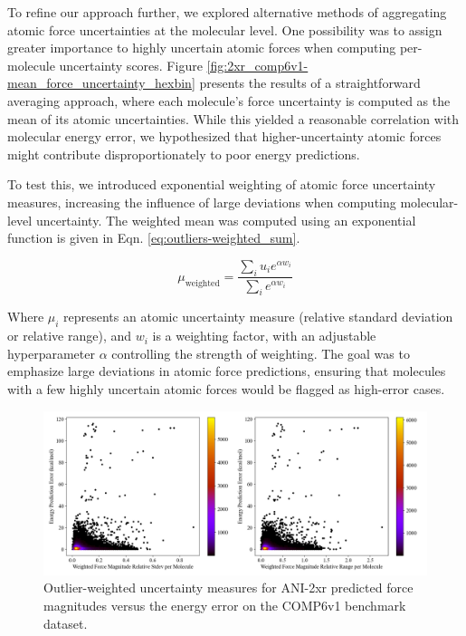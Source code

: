 To refine our approach further, we explored alternative methods of aggregating atomic force uncertainties at the molecular level. One possibility was to assign greater importance to highly uncertain atomic forces when computing per-molecule uncertainty scores. Figure \ref{fig:2xr_comp6v1-mean_force_uncertainty_hexbin} presents the results of a straightforward averaging approach, where each molecule's force uncertainty is computed as the mean of its atomic uncertainties. While this yielded a reasonable correlation with molecular energy error, we hypothesized that higher-uncertainty atomic forces might contribute disproportionately to poor energy predictions.

To test this, we introduced exponential weighting of atomic force uncertainty measures, increasing the influence of large deviations when computing molecular-level uncertainty. The weighted mean was computed using an exponential function is given in Eqn. \ref{eq:outliers-weighted_sum}.

\begin{equation} 
\mu_{\text{weighted}} = \frac{\sum_i u_i e^{\alpha w_i}}{\sum_i e^{\alpha w_i}} 
\label{eq:outliers-weighted_sum}
\end{equation}

Where $\mu_i$ represents an atomic uncertainty measure (relative standard deviation or relative range), and $w_i$ is a weighting factor, with an adjustable hyperparameter $\alpha$ controlling the strength of weighting. The goal was to emphasize large deviations in atomic force predictions, ensuring that molecules with a few highly uncertain atomic forces would be flagged as high-error cases.


\begin{figure}[!hp]
    \centering
    \includegraphics[width=1\linewidth]{Images/2xr_forces/2xr_comp6v1_force-weighted-uncertainty-vs-energy.png}
    \caption[Force uncertainty weighted by outliers versus energy error (COMP6v1)]{Outlier-weighted uncertainty measures for ANI-2xr predicted force magnitudes versus the energy error on the COMP6v1 benchmark dataset.}
    \label{fig:2xr_comp6v1-forces-weighed_uncertainty}
\end{figure}

